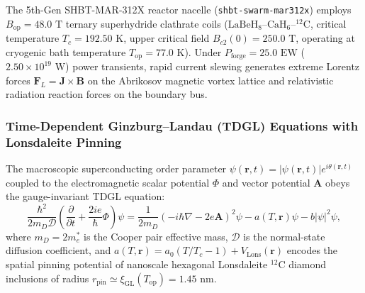 \documentclass[11pt,onecolumn]{article}
\begin{document}
The 5th-Gen SHBT-MAR-312X reactor nacelle (\texttt{shbt-swarm-mar312x}) employs $B_{\mathrm{op}} = 48.0\text{ T}$ ternary superhydride clathrate coils ($\mathrm{LaBeH}_8\text{--}\mathrm{CaH}_6\text{--}{}^{12}\mathrm{C}$, critical temperature $T_c = 192.50\text{ K}$, upper critical field $B_{c2}(0) = 250.0\text{ T}$, operating at cryogenic bath temperature $T_{\mathrm{op}} = 77.0\text{ K}$). Under $P_{\mathrm{forge}} = 25.0\text{ EW}$ ($2.50 \times 10^{19}\text{ W}$) power transients, rapid current slewing generates extreme Lorentz forces $\mathbf{F}_L = \mathbf{J} \times \mathbf{B}$ on the Abrikosov magnetic vortex lattice and relativistic radiation reaction forces on the boundary bus.

\subsubsection{Time-Dependent Ginzburg--Landau (TDGL) Equations with Lonsdaleite Pinning}
The macroscopic superconducting order parameter $\psi(\mathbf{r}, t) = |\psi(\mathbf{r}, t)|e^{i\theta(\mathbf{r},t)}$ coupled to the electromagnetic scalar potential $\Phi$ and vector potential $\mathbf{A}$ obeys the gauge-invariant TDGL equation:
\begin{equation}
\frac{\hbar^2}{2m_D \mathcal{D}}\left(\frac{\partial}{\partial t} + \frac{2ie}{\hbar}\Phi\right)\psi = \frac{1}{2m_D}\left(-i\hbar\nabla - 2e\mathbf{A}\right)^2\psi - a(T, \mathbf{r})\psi - b|\psi|^2\psi,
\label{eq:tdgl_main}
\end{equation}
where $m_D = 2m_e^*$ is the Cooper pair effective mass, $\mathcal{D}$ is the normal-state diffusion coefficient, and $a(T, \mathbf{r}) = a_0(T/T_c - 1) + V_{\mathrm{Lons}}(\mathbf{r})$ encodes the spatial pinning potential of nanoscale hexagonal Lonsdaleite ${}^{12}\mathrm{C}$ diamond inclusions of radius $r_{\mathrm{pin}} \simeq \xi_{\mathrm{GL}}(T_{\mathrm{op}}) = 1.45\text{ nm}$.
\end{document}
